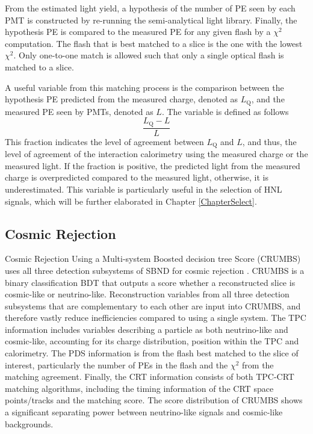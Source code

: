 From the estimated light yield, a hypothesis of the number of PE seen by each PMT is constructed by re-running the semi-analytical light library.
Finally, the hypothesis PE is compared to the measured PE for any given flash by a $\chi^2$ computation.
The flash that is best matched to a slice is the one with the lowest $\chi^2$.
Only one-to-one match is allowed such that only a single optical flash is matched to a slice.

A useful variable from this matching process is the comparison between the hypothesis PE predicted from the measured charge, denoted as $L_{\mathrm{Q}}$, and the measured PE seen by PMTs, denoted as $L$.                                                                            
The variable is defined as follows
\begin{equation}
\label{eq:opt0fraction}
        \frac{L_{\mathrm{Q}} - L}{L}
\end{equation}
This fraction indicates the level of agreement between $L_{\mathrm{Q}}$ and $L$, and thus, the level of agreement of the interaction calorimetry using the measured charge or the measured light.
If the fraction is positive, the predicted light from the measured charge is overpredicted compared to the measured light, otherwise, it is underestimated.
This variable is particularly useful in the selection of HNL signals, which will be further elaborated in Chapter \ref{ChapterSelect}.

\subsection{Cosmic Rejection}
\label{sec:crumbs}

Cosmic Rejection Using a Multi-system Boosted decision tree Score (CRUMBS) uses all three detection subsystems of SBND for cosmic rejection \cite{crumbs}. 
CRUMBS is a binary classification BDT that outputs a score whether a reconstructed slice is cosmic-like or neutrino-like.
Reconstruction variables from all three detection subsystems that are complementary to each other are input into CRUMBS, and therefore vastly reduce inefficiencies compared to using a single system.
The TPC information includes variables describing a particle as both neutrino-like and cosmic-like, accounting for its charge distribution, position within the TPC and calorimetry.  
The PDS information is from the flash best matched to the slice of interest, particularly the number of PEs in the flash and the $\chi^{2}$  from the matching agreement.                        
Finally, the CRT information consists of both TPC-CRT matching algorithms, including the timing information of the CRT space points/tracks and the matching score.
The score distribution of CRUMBS shows a significant separating power between neutrino-like signals and cosmic-like backgrounds.

